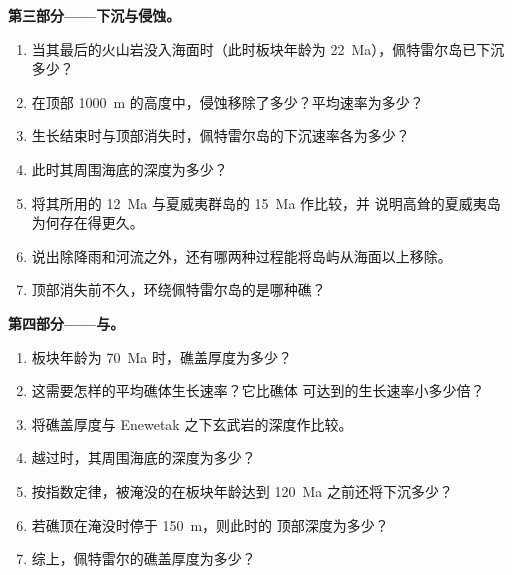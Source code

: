 \begin{problem}
\noindent\textbf{第三部分——下沉与侵蚀。}
\begin{enumerate}[resume]
  \item 当其最后的火山岩没入海面时（此时板块年龄为
        \qty{22}{Ma}），佩特雷尔岛已下沉多少？
  \item 在顶部 \qty{1000}{m} 的高度中，侵蚀移除了多少？平均速率为多少？
  \item 生长结束时与顶部消失时，佩特雷尔岛的下沉速率各为多少？
  \item 此时其周围海底的深度为多少？
  \item 将其所用的 \qty{12}{Ma} 与夏威夷群岛的 \qty{15}{Ma} 作比较，并
        说明高耸的夏威夷岛为何存在得更久。
  \item 说出除降雨和河流之外，还有哪两种过程能将岛屿从海面以上移除。
  \item 顶部消失前不久，环绕佩特雷尔岛的是哪种礁？
\end{enumerate}

\noindent\textbf{第四部分——与。}
\begin{enumerate}[resume]
  \item 板块年龄为 \qty{70}{Ma} 时，礁盖厚度为多少？
  \item 这需要怎样的平均礁体生长速率？它比礁体
        可达到的生长速率小多少倍？
  \item 将礁盖厚度与 Enewetak 之下玄武岩的深度作比较。
  \item {}越过时，其周围海底的深度为多少？
  \item 按指数定律，被淹没的在板块年龄达到
        \qty{120}{Ma} 之前还将下沉多少？
  \item 若礁顶在淹没时停于 \qty{150}{m}，则此时的
        顶部深度为多少？
  \item 综上，佩特雷尔的礁盖厚度为多少？
\end{enumerate}
\end{problem}
